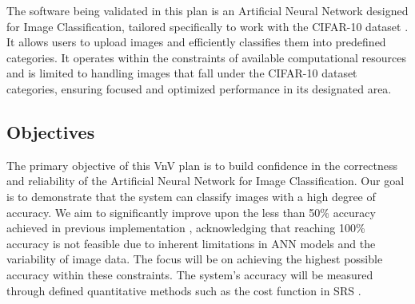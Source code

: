 \documentclass[12pt, titlepage]{article}
\begin{document}
The software being validated in this plan is an Artificial Neural Network designed for 
Image Classification, tailored specifically to work with the CIFAR-10 dataset \cite{CIFAR10}. 
It allows users to upload images and efficiently classifies them into predefined 
categories. It operates within the constraints of available computational 
resources and is limited to handling images that fall under the CIFAR-10 dataset \cite{CIFAR10}
categories, ensuring focused and optimized performance in its designated area.

\subsection{Objectives}

The primary objective of this VnV plan is to build confidence in the correctness and 
reliability of the Artificial Neural Network for Image Classification. Our goal is to 
demonstrate that the system can classify images with a high degree of accuracy. We aim 
to significantly improve upon the less than 50\% accuracy achieved in 
previous implementation \cite{ANN:CIFAR10}, 
acknowledging that reaching 100\% accuracy is not feasible due to inherent limitations in 
ANN models and the variability of image data. The focus will be on achieving the highest 
possible accuracy within these constraints. The system's accuracy will be measured through 
defined quantitative methods such as the cost function in SRS \cite{SRS}.



\end{document}
